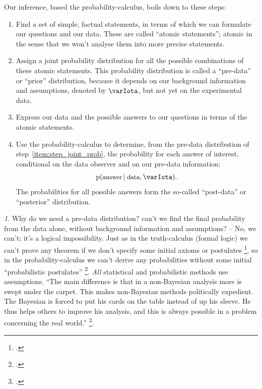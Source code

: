 \documentclass[\ifafour a4paper,12pt,\else a5paper,10pt,\fi%
onecolumn,oneside,article,%
british%
]{memoir}
\theoremstyle{remark}
\theoremstyle{innote}
\newtheorem*{innote}{}
\newcommand*{\citep}{\footcites}
\newcommand*{\pf}{\mathrm{p}}%
\renewcommand*{\|}[1][]{\nonscript\,#1\vert\nonscript\;\mathopen{}}
\newcommand*{\sect}{\S}%
\newcommand*{\yI}{\varIota}
\begin{document}
Our inference, based the probability-calculus, boils down to these steps:
\begin{enumerate}[label=\arabic*.]
\item \label{item:step_statements} Find a set of simple, factual
  statements, in terms of which we can formulate our questions and our
  data. These are called \enquote{atomic statements}; atomic in the sense
  that we won't analyse them into more precise statements.

\item \label{item:step_joint_prob} Assign a joint probability distribution
  for all the possible combinations of these atomic statements. This
  probability distribution is called a \enquote{pre-data} or
  \enquote{prior} distribution, because it depends on our background
  information and assumptions, denoted by $\yI$, but not yet on the
  experimental data.

\item \label{item:step_formulate_question_data} Express our data and the
  possible answers to our questions in terms of the atomic statements.

\item \label{item:step_calculate_probabilities} Use the
  probability-calculus to determine, from the pre-data distribution of
  step~\ref{item:step_joint_prob}, the probability for each answer of
  interest, conditional on the data observer and on our pre-data
  information:
  \begin{equation}
    \label{eq:basic_conditional_prob}
    \pf(\text{\small answer} \| \text{\small data}, \yI).
  \end{equation}
  The probabilities for all possible answers form the so-called
  \enquote{post-data} or \enquote{posterior} distribution.
\end{enumerate}

\begin{innote}
  Why do we need a pre-data distribution? can't we find the final
  probability from the data alone, without background information and
  assumptions? -- No, we can't; it's a logical impossibility. Just as in
  the truth-calculus (formal logic) we can't prove any theorem if we don't
  specify some initial axioms or postulates \citep[\sect~2.1
  p.~43]{barwiseetal1990_r2003}, so in the probability-calculus we can't
  derive any probabilities without some initial \enquote{probabilistic
    postulates} \citep{hailperin2011}[p.~182]{johnson1924}. \emph{All}
  statistical and probabilistic methods use assumptions. \enquote{The main
    difference is that in a non-Bayesian analysis more is swept under the
    carpet. This makes non-Bayesian methods politically expedient. The
    Bayesian is forced to put his cards on the table instead of up his
    sleeve. He thus helps others to improve his analysis, and this is
    always possible in a problem concerning the real world.}
  \citep[\sect~2.3 p.~26]{good1969}.
\end{innote}
\end{document}
